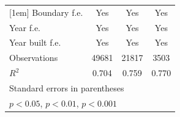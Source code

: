\begin{table}[htbp]
\begin{tabular}{l*{3}{c}}
[1em]
Boundary f.e.       &         Yes         &         Yes         &         Yes         \\
[1em]
Year f.e.           &         Yes         &         Yes         &         Yes         \\
[1em]
Year built f.e.     &         Yes         &         Yes         &         Yes         \\
\hline
Observations        &       49681         &       21817         &        3503         \\
\(R^{2}\)           &       0.704         &       0.759         &       0.770         \\
\hline\hline
\multicolumn{4}{l}{\footnotesize Standard errors in parentheses}\\
\multicolumn{4}{l}{\footnotesize \sym{*} \(p<0.05\), \sym{**} \(p<0.01\), \sym{***} \(p<0.001\)}\\
\end{tabular}
\end{table}

